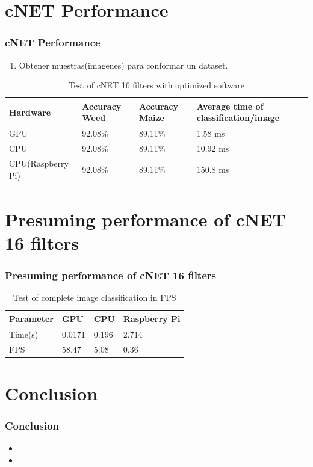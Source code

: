 \documentclass[10pt,a4paper]{beamer}
\begin{document}
\section{cNET Performance}
\begin{frame}
\frametitle{cNET Performance}
\begin{enumerate}
\item Obtener muestras(imagenes) para conformar un dataset.
\end{enumerate}
\begin{table}[h!]
\centering
\renewcommand{\arraystretch}{1.2}
\caption{Test of cNET 16 filters with optimized software}
\label{table:5}
\begin{tabular}[c c c c]{|p{2.2 cm} p{1.1cm} p{1.1cm} p{2.4cm}|} 
 \hline
 \textbf{Hardware } & \textbf{Accuracy Weed} & \textbf{Accuracy Maize} & \textbf{Average time of classification/image}\\ 
 \hline 
 GPU & 92.08\% & 89.11\% & 1.58 ms \\ [0.95ex]
 CPU & 92.08\% & 89.11\% & 10.92 ms \\ [0.95ex]
 CPU(Raspberry Pi) & 92.08\% & 89.11\% & 150.8 ms \\ [0.95ex]
 \hline
\end{tabular}
\end{table}
\end{frame}
\section{Presuming performance of cNET 16 filters}
\begin{frame}
\frametitle{Presuming performance of cNET 16 filters}
\begin{table}[h!]
\centering
\renewcommand{\arraystretch}{1.2}
\caption{Test of complete image classification in FPS}
\label{table:6}
\begin{tabular}[c c c c]{|p{1.0 cm} p{1.7cm} p{1.7cm} p{1.7cm}|} 
 \hline
 \textbf{Parameter} &\textbf{GPU } & \textbf{CPU} & \textbf{Raspberry Pi} \\ 
 \hline
 Time(s) & 0.0171 & 0.196 & 2.714 \\ [0.95ex]
 FPS & 58.47 & 5.08 & 0.36 \\ [0.95ex]
 \hline
\end{tabular}
\end{table}
\end{frame}
\section{Conclusion}
\begin{frame}
\frametitle{Conclusion}
\begin{itemize}
\item
\item
\end{itemize}
\end{frame}
\end{document}
